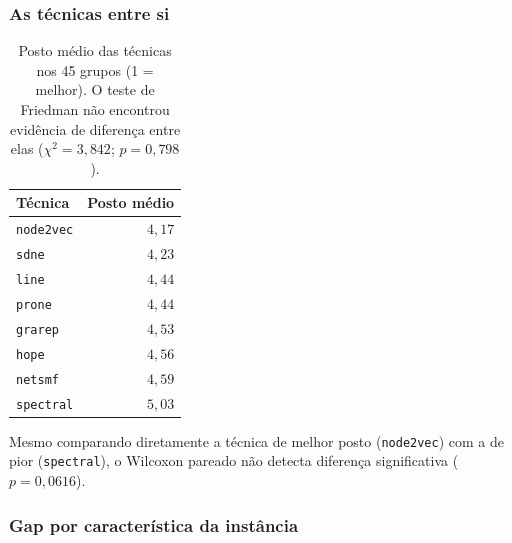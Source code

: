 \documentclass[12pt,a4paper]{article}
\begin{document}
\subsubsection{As técnicas entre si}

\begin{table}[htbp]
\centering\small
\caption{Posto médio das técnicas nos 45 grupos (1 = melhor). O teste de
Friedman não encontrou evidência de diferença entre elas
($\chi^2 = 3{,}842$; $p = 0{,}798$).}
\label{tab:postos}
\begin{tabular}{lr}
\toprule
Técnica & Posto médio \\
\midrule
\texttt{node2vec} & $4{,}17$ \\
\texttt{sdne}     & $4{,}23$ \\
\texttt{line}     & $4{,}44$ \\
\texttt{prone}    & $4{,}44$ \\
\texttt{grarep}   & $4{,}53$ \\
\texttt{hope}     & $4{,}56$ \\
\texttt{netsmf}   & $4{,}59$ \\
\texttt{spectral} & $5{,}03$ \\
\bottomrule
\end{tabular}
\end{table}

Mesmo comparando diretamente a técnica de melhor posto
(\texttt{node2vec}) com a de pior (\texttt{spectral}), o Wilcoxon pareado
não detecta diferença significativa ($p = 0{,}0616$).

\subsubsection{Gap por característica da instância}
\end{document}
